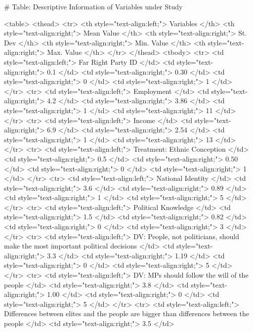 # Table: Descriptive Information of Variables under Study 

<table>
 <thead>
  <tr>
   <th style="text-align:left;"> Variables </th>
   <th style="text-align:right;"> Mean Value </th>
   <th style="text-align:right;"> St. Dev </th>
   <th style="text-align:right;"> Min. Value </th>
   <th style="text-align:right;"> Max. Value </th>
  </tr>
 </thead>
<tbody>
  <tr>
   <td style="text-align:left;"> Far Right Party ID </td>
   <td style="text-align:right;"> 0.1 </td>
   <td style="text-align:right;"> 0.30 </td>
   <td style="text-align:right;"> 0 </td>
   <td style="text-align:right;"> 1 </td>
  </tr>
  <tr>
   <td style="text-align:left;"> Employment </td>
   <td style="text-align:right;"> 4.2 </td>
   <td style="text-align:right;"> 3.86 </td>
   <td style="text-align:right;"> 1 </td>
   <td style="text-align:right;"> 11 </td>
  </tr>
  <tr>
   <td style="text-align:left;"> Income </td>
   <td style="text-align:right;"> 6.9 </td>
   <td style="text-align:right;"> 2.54 </td>
   <td style="text-align:right;"> 1 </td>
   <td style="text-align:right;"> 13 </td>
  </tr>
  <tr>
   <td style="text-align:left;"> Treatment: Ethnic Conception </td>
   <td style="text-align:right;"> 0.5 </td>
   <td style="text-align:right;"> 0.50 </td>
   <td style="text-align:right;"> 0 </td>
   <td style="text-align:right;"> 1 </td>
  </tr>
  <tr>
   <td style="text-align:left;"> National Identity </td>
   <td style="text-align:right;"> 3.6 </td>
   <td style="text-align:right;"> 0.89 </td>
   <td style="text-align:right;"> 1 </td>
   <td style="text-align:right;"> 5 </td>
  </tr>
  <tr>
   <td style="text-align:left;"> Political Knowledge </td>
   <td style="text-align:right;"> 1.5 </td>
   <td style="text-align:right;"> 0.82 </td>
   <td style="text-align:right;"> 0 </td>
   <td style="text-align:right;"> 3 </td>
  </tr>
  <tr>
   <td style="text-align:left;"> DV: People, not politicians, 
 should make the most 
 important political decisions </td>
   <td style="text-align:right;"> 3.3 </td>
   <td style="text-align:right;"> 1.19 </td>
   <td style="text-align:right;"> 0 </td>
   <td style="text-align:right;"> 5 </td>
  </tr>
  <tr>
   <td style="text-align:left;"> DV: MPs should follow 
 the will of the people </td>
   <td style="text-align:right;"> 3.8 </td>
   <td style="text-align:right;"> 1.00 </td>
   <td style="text-align:right;"> 0 </td>
   <td style="text-align:right;"> 5 </td>
  </tr>
  <tr>
   <td style="text-align:left;"> Differences between elites and 
 the people are bigger than 
 differences between the people </td>
   <td style="text-align:right;"> 3.5 </td>
